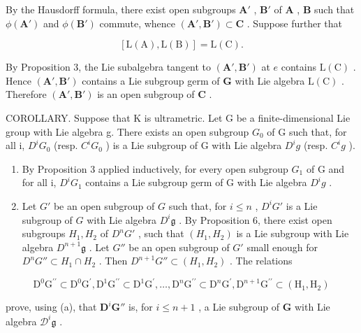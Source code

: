 By the Hausdorff formula, there exist open subgroups \(\mathbf{A}'\) , \(\mathbf{B}'\) of \(\mathbf{A}\) , \(\mathbf{B}\) such that \(\phi(\mathbf{A}')\) and \(\phi(\mathbf{B}')\) commute, whence \((\mathbf{A}', \mathbf{B}') \subset \mathbf{C}\) . Suppose further that

\[
[ \mathrm{L} (\mathrm{A}), \mathrm{L} (\mathrm{B}) ] = \mathrm{L} (\mathrm{C}).
\]

By Proposition 3, the Lie subalgebra tangent to \((\mathbf{A}',\mathbf{B}')\) at \(e\) contains \(\mathrm{L}(\mathrm{C})\) . Hence \((\mathbf{A}',\mathbf{B}')\) contains a Lie subgroup germ of \(\mathbf{G}\) with Lie algebra \(\mathrm{L}(\mathrm{C})\) . Therefore \((\mathbf{A}',\mathbf{B}')\) is an open subgroup of \(\mathbf{C}\) .

COROLLARY. Suppose that K is ultrametric. Let G be a finite-dimensional Lie group with Lie algebra g. There exists an open subgroup \(G_{0}\) of G such that, for all i, \(D^{i}G_{0}\) (resp. \(C^{i}G_{0}\) ) is a Lie subgroup of G with Lie algebra \(D^{i}g\) (resp. \(C^{i}g\) ).

\begin{enumerate}
\def\labelenumi{(\alph{enumi})}
\item
  By Proposition 3 applied inductively, for every open subgroup \(G_{1}\) of G and for all i, \(D^{i}G_{1}\) contains a Lie subgroup germ of G with Lie algebra \(D^{i}g\) .
\item
  Let \(G'\) be an open subgroup of \(G\) such that, for \(i \leqslant n\) , \(D^i G'\) is a Lie subgroup of \(G\) with Lie algebra \(D^i\mathfrak{g}\) . By Proposition 6, there exist open subgroups \(H_1, H_2\) of \(D^n G'\) , such that \((H_1, H_2)\) is a Lie subgroup with Lie algebra \(D^{n+1}\mathfrak{g}\) . Let \(G''\) be an open subgroup of \(G'\) small enough for \(D^n G'' \subset H_1 \cap H_2\) . Then \(D^{n+1}G'' \subset (H_1, H_2)\) . The relations
\end{enumerate}

\[
\mathrm{D} ^ {0} \mathrm{G} ^ {\prime \prime} \subset \mathrm{D} ^ {0} \mathrm{G} ^ {\prime}, \mathrm{D} ^ {1} \mathrm{G} ^ {\prime \prime} \subset \mathrm{D} ^ {1} \mathrm{G} ^ {\prime}, \dots , \mathrm{D} ^ {n} \mathrm{G} ^ {\prime \prime} \subset \mathrm{D} ^ {n} \mathrm{G} ^ {\prime}, \mathrm{D} ^ {n + 1} \mathrm{G} ^ {\prime \prime} \subset (\mathrm{H} _ {1}, \mathrm{H} _ {2})
\]

prove, using (a), that \(\mathbf{D}^i\mathbf{G}''\) is, for \(i\leqslant n + 1\) , a Lie subgroup of \(\mathbf{G}\) with Lie algebra \(\mathcal{D}^i\mathfrak{g}\) .

